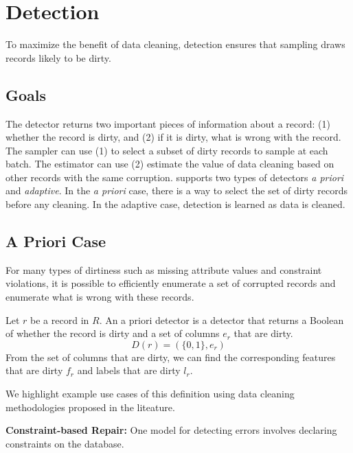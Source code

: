\section{Detection}\label{det}
To maximize the benefit of data cleaning, detection ensures that sampling draws records likely to be dirty.

\subsection{Goals}
The detector returns two important pieces of information about a record: (1) whether the record is dirty, and (2) if it is dirty, what is wrong with the record.
The sampler can use (1) to select a subset of dirty records to sample at each batch. 
The estimator can use (2) estimate the value of data cleaning based on other records with the same corruption.
\sys supports two types of detectors \emph{a priori} and \emph{adaptive}.
In the \emph{a priori} case, there is a way to select the set of dirty records before any cleaning.
In the adaptive case, detection is learned as data is cleaned.

\subsection{A Priori Case}
For many types of dirtiness such as missing attribute values and constraint violations, it is possible to efficiently enumerate a set of corrupted records and enumerate what is wrong with these records.

\begin{definition}
Let $r$ be a record in $R$. An a priori detector is a detector that returns a Boolean of whether the record is dirty and a set of columns $e_r$ that are dirty.
\[
D(r) = (\{0,1\}, e_r)
\]
From the set of columns that are dirty, we can find the corresponding features that are dirty $f_r$ and labels that are dirty $l_r$.
\end{definition}

\noindent We highlight example use cases of this definition using data cleaning methodologies proposed in the liteature.

\vspace{0.5em}

\noindent\textbf{Constraint-based Repair: }
One model for detecting errors involves declaring constraints on the database.

\vspace{0.5em}

